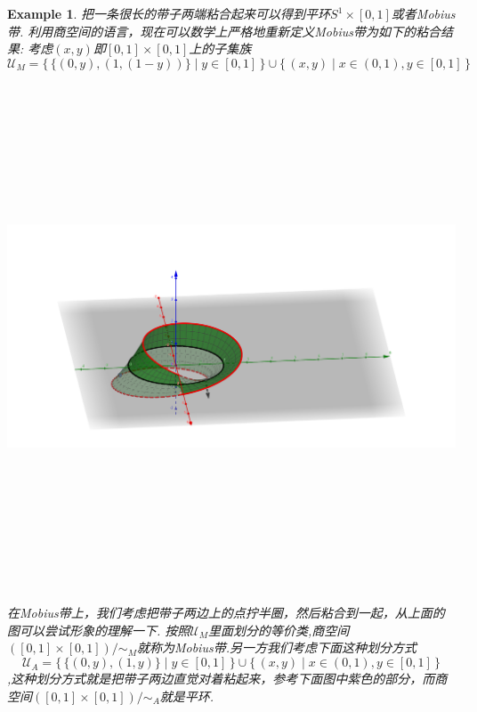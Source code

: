 \documentclass{article}
\newtheorem{example}[theorem]{Example}
\newcommand\Set[2]{\{\,#1\mid#2\,\}} %
\begin{document}
\begin{example}
把一条很长的带子两端粘合起来可以得到平环$S^1 \times [0,1]$或者Mobius带. 利用商空间的语言，现在可以数学上严格地重新定义Mobius带为如下的粘合结果: 考虑$(x,y)$即$[0,1] \times [0,1]$上的子集族\[\mathcal{U}_M = \Set{\{(0,y),(1,(1-y))\}}{y \in [0,1]} \cup \Set{{(x,y)}}{x \in (0,1), y \in [0,1]} \]
\begin{center}
\includegraphics[width=20cm, height=15cm]{images/Mobius.png}
\end{center}
在Mobius带上，我们考虑把带子两边上的点拧半圈，然后粘合到一起，从上面的图可以尝试形象的理解一下. 按照$\mathcal{U}_M$里面划分的等价类,商空间$([0,1] \times [0,1]) / \sim_M$就称为Mobius带.另一方我们考虑下面这种划分方式\[\mathcal{U}_A = \Set{\{(0,y),(1,y)\}}{y \in [0,1]} \cup \Set{{(x,y)}}{x \in (0,1), y \in [0,1]}\],这种划分方式就是把带子两边直觉对着粘起来，参考下面图中紫色的部分，而商空间$([0,1] \times [0,1]) / \sim_A$就是平环.


\end{example}
\end{document}
